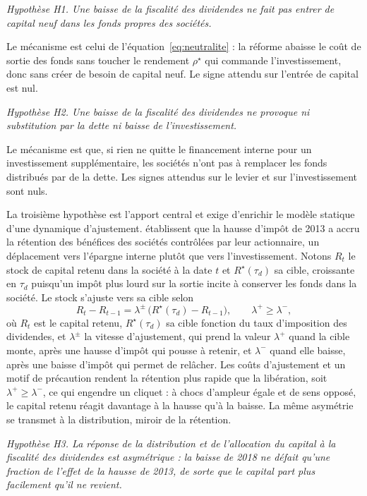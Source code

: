 \medskip
\noindent\textit{Hypothèse H1. Une baisse de la fiscalité des dividendes ne fait pas entrer de
capital neuf dans les fonds propres des sociétés.}
\smallskip

\noindent Le mécanisme est celui de l'équation~\eqref{eq:neutralite} : la réforme abaisse le coût de
sortie des fonds sans toucher le rendement $\rho^{\star}$ qui commande l'investissement, donc sans
créer de besoin de capital neuf. Le signe attendu sur l'entrée de capital est nul.

\medskip
\noindent\textit{Hypothèse H2. Une baisse de la fiscalité des dividendes ne provoque ni substitution
par la dette ni baisse de l'investissement.}
\smallskip

\noindent Le mécanisme est que, si rien ne quitte le financement interne pour un investissement
supplémentaire, les sociétés n'ont pas à remplacer les fonds distribués par de la dette. Les signes
attendus sur le levier et sur l'investissement sont nuls.

La troisième hypothèse est l'apport central et exige d'enrichir le modèle statique d'une dynamique
d'ajustement. \citet{bach2023} établissent que la hausse d'impôt de 2013 a accru la rétention des
bénéfices des sociétés contrôlées par leur actionnaire, un déplacement vers l'épargne interne plutôt
que vers l'investissement. Notons $R_t$ le stock de capital retenu dans la société à la date $t$ et
$R^{\star}(\tau_d)$ sa cible, croissante en $\tau_d$ puisqu'un impôt plus lourd sur la sortie incite
à conserver les fonds dans la société. Le stock s'ajuste vers sa cible selon
\begin{equation}\label{eq:ajustement}
  R_t - R_{t-1} = \lambda^{\pm}\,\bigl(R^{\star}(\tau_d) - R_{t-1}\bigr),
  \qquad \lambda^{+} \ge \lambda^{-},
\end{equation}
où $R_t$ est le capital retenu, $R^{\star}(\tau_d)$ sa cible fonction du taux d'imposition des
dividendes, et $\lambda^{\pm}$ la vitesse d'ajustement, qui prend la valeur $\lambda^{+}$ quand la
cible monte, après une hausse d'impôt qui pousse à retenir, et $\lambda^{-}$ quand elle baisse, après
une baisse d'impôt qui permet de relâcher. Les coûts d'ajustement et un motif de précaution rendent
la rétention plus rapide que la libération, soit $\lambda^{+} \ge \lambda^{-}$, ce qui engendre un
cliquet : à chocs d'ampleur égale et de sens opposé, le capital retenu réagit davantage à la hausse
qu'à la baisse. La même asymétrie se transmet à la distribution, miroir de la rétention.

\medskip
\noindent\textit{Hypothèse H3. La réponse de la distribution et de l'allocation du capital à la
fiscalité des dividendes est asymétrique : la baisse de 2018 ne défait qu'une fraction de l'effet de
la hausse de 2013, de sorte que le capital part plus facilement qu'il ne revient.}
\smallskip

